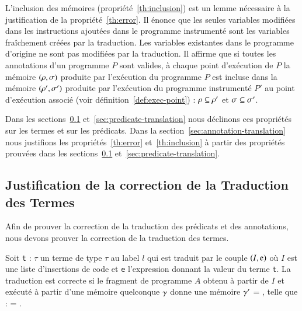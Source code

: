 L'inclusion des mémoires (propriété~\ref{th:inclusion}) est un lemme
nécessaire à la justification de la propriété~\ref{th:error}.
Il énonce que les seules variables modifiées dans les instructions ajoutées dans
le programme instrumenté sont les variables fraîchement créées par la
traduction.
Les variables existantes dans le programme d'origine ne sont pas modifiées par
la traduction.
Il affirme que si toutes les annotations d'un programme $P$ sont valides, à
chaque point d'exécution de $P$ la mémoire $(\rho, \sigma)$ produite par
l'exécution du programme $P$ est incluse dans la mémoire $(\rho', \sigma')$
produite par l'exécution du programme instrumenté $P'$ au point d'exécution
associé (voir définition~\ref{def:exec-point}) :
$\rho \subseteq \rho'$ et $\sigma \subseteq \sigma'$.

Dans les sections~\ref{sec:term-translation} et~\ref{sec:predicate-translation}
nous déclinons ces propriétés sur les termes et sur les prédicats.
Dans la section~\ref{sec:annotation-translation} nous justifions les
propriétés~\ref{th:error} et~\ref{th:inclusion} à partir des propriétés prouvées
dans les sections~\ref{sec:term-translation} et~\ref{sec:predicate-translation}.


\subsection{Justification de la correction de la Traduction des Termes}
\label{sec:term-translation}

Afin de prouver la correction de la traduction des prédicats et des annotations,
nous devons prouver la correction de la traduction des termes.

\begin{myproperty}
  \label{lem:term-correct}
  Soit \lstinline't' : $\tau$ un terme de type $\tau$ au label $l$ qui est
  traduit par le couple $(I, \mbox{\lstinline'e'})$ où $I$ est une liste
  d'insertions de code et \lstinline'e' l'expression donnant la valeur du terme
  \lstinline't'.
  La traduction est correcte si le fragment de programme $A$ obtenu à partir de
  $I$ et exécuté à partir d'une mémoire quelconque $\gamma$ donne une
  mémoire $\gamma'$ = , telle que :
   = .
\end{myproperty}

